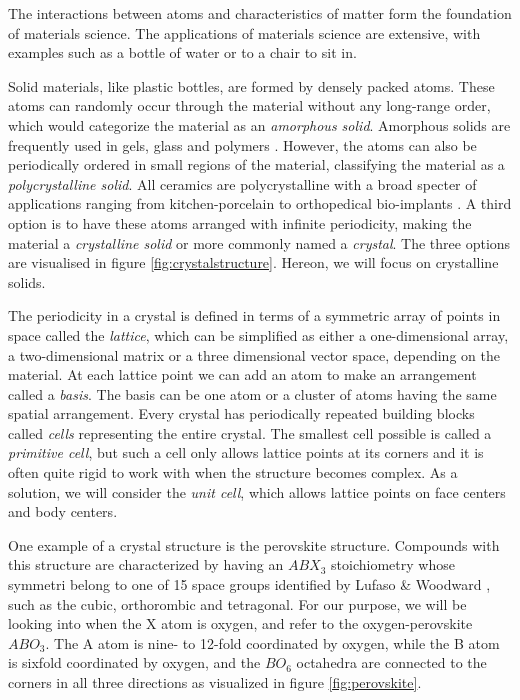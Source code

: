 The interactions between atoms and characteristics of matter form the foundation of materials science. The applications of materials science are extensive, with examples such as a bottle of water or to a chair to sit in.

Solid materials, like plastic bottles, are formed by densely packed atoms. These atoms can randomly occur through the material without any long-range order, which would categorize the material as an \textit{amorphous solid}. Amorphous solids are frequently used in gels, glass and polymers \cite{BenStreetman2015}. However, the atoms can also be periodically ordered in small regions of the material, classifying the material as a \textit{polycrystalline solid}. All ceramics are polycrystalline with a broad specter of applications ranging from kitchen-porcelain to orthopedical bio-implants \cite{Renganathan2018}. A third option is to have these atoms arranged with infinite periodicity, making the material a \textit{crystalline solid} or more commonly named a \textit{crystal}. The three options are visualised in figure \ref{fig:crystalstructure}. Hereon, we will focus on crystalline solids.

The periodicity in a crystal is defined in terms of a symmetric array of points in space called the \textit{lattice}, which can be simplified as either a one-dimensional array, a two-dimensional matrix or a three dimensional vector space, depending on the material. At each lattice point we can add an atom to make an arrangement called a \textit{basis}. The basis can be one atom or a cluster of atoms having the same spatial arrangement. Every crystal has periodically repeated building blocks called \textit{cells} representing the entire crystal. The smallest cell possible is called a \textit{primitive cell}, but such a cell only allows lattice points at its corners and it is often quite rigid to work with when the structure becomes complex. As a solution, we will consider the \textit{unit cell}, which allows lattice points on face centers and body centers.

\newpage



\newpage
One example of a crystal structure is the perovskite structure. Compounds with this structure are characterized by having an $ABX_3$ stoichiometry whose symmetri belong to one of 15 space groups identified by Lufaso \& Woodward \cite{Lufaso2001}, such as the cubic, orthorombic and tetragonal. For our purpose, we will be looking into when the X atom is oxygen, and refer to the oxygen-perovskite $ABO_3$. The A atom is nine- to 12-fold coordinated by oxygen, while the B atom is sixfold coordinated by oxygen, and the $BO_6$ octahedra are connected to the corners in all three directions as visualized in figure \ref{fig:perovskite}.

